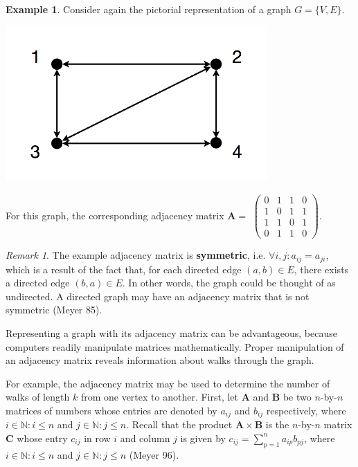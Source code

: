 \documentclass[12pt]{amsart}
\theoremstyle{definition}
\newtheorem{example}[thm]{Example}
\theoremstyle{remark}
\newtheorem{remark}[thm]{Remark}
\numberwithin{equation}{section}
\newcommand{\N}{\mathbb{N}}
\begin{document}
\begin{example}
Consider again the pictorial representation of a graph $G = \{V,E\}$.

\begin{center}\includegraphics[width=10cm]{figure-1-2.png}\end{center}

\noindent For this graph, the corresponding adjacency matrix $\mathbf{A} = $
$
\left( \begin{array}{cccc}
0 & 1 & 1 & 0 \\
1 & 0 & 1 & 1 \\
1 & 1 & 0 & 1 \\
0 & 1 & 1 & 0 \end{array} \right)
$.
\end{example}

\begin{remark}
The example adjacency matrix is \textbf{symmetric}, i.e. $\forall i,j : a_{ij} = a_{ji}$, which is a result of the fact that, for each directed edge $(a,b) \in E$, there exists a directed edge $(b,a) \in E$. In other words, the graph could be thought of as undirected. A directed graph may have an adjacency matrix that is not symmetric (Meyer 85).
\end{remark}

Representing a graph with its adjacency matrix can be advantageous, because computers readily manipulate matrices mathematically. Proper manipulation of an adjacency matrix reveals information about walks through the graph.

For example, the adjacency matrix may be used to determine the number of walks of length $k$ from one vertex to another. First, let $\mathbf{A}$ and $\mathbf{B}$ be two $n$-by-$n$ matrices of numbers whose entries are denoted by $a_{ij}$ and $b_{ij}$ respectively, where $i \in \N : i \le n$ and $j \in \N : j \le n$. Recall that the product $\mathbf{A} \times \mathbf{B}$ is the $n$-by-$n$ matrix $\mathbf{C}$ whose entry $c_{ij}$ in row $i$ and column $j$ is given by $c_{ij} = \sum_{p=1}^n a_{ip} b_{pj}$, where $i \in \N : i \le n$ and $j \in \N : j \le n$ (Meyer 96).
\end{document}

